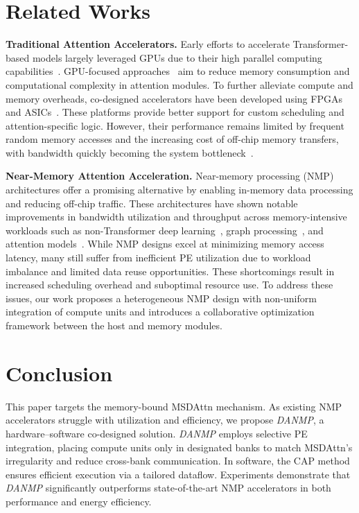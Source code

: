 \documentclass[sigconf]{acmart}
\begin{document}
\section{Related Works}
{\bf Traditional Attention Accelerators.} Early efforts to accelerate Transformer-based models largely leveraged GPUs due to their high parallel computing capabilities~\cite{Vaswani17, bert18, longformer20, Flashatten2022, zhu2021deformable, Li_2022_CVPR, zhang2023dino, Aken19, RoBERTa2019, Arnab_2021_ICCV}. GPU-focused approaches~\cite{longformer20, Flashatten2022, Zaheer20, Performer2020, Linformer2020, wu2020visual, Zaheer20} aim to reduce memory consumption and computational complexity in attention modules. To further alleviate compute and memory overheads, co-designed accelerators have been developed using FPGAs~\cite{Zhang21, bai2024dac, Li20, Ye2023} and ASICs~\cite{Ham20, Lu21, Qu22, xu2024defa, Qin2023, You2023}. These platforms provide better support for custom scheduling and attention-specific logic. However, their performance remains limited by frequent random memory accesses and the increasing cost of off-chip memory transfers, with bandwidth quickly becoming the system bottleneck~\cite{Xie2021, pim-mmu2024}.

{\bf Near-Memory Attention Acceleration.} Near-memory processing (NMP) architectures offer a promising alternative by enabling in-memory data processing and reducing off-chip traffic. These architectures have shown notable improvements in bandwidth utilization and throughput across memory-intensive workloads such as non-Transformer deep learning~\cite{Gao2017, ReGNN2022, Xu2024, Kal2021, Park2021, Liu2023, Angizi2018}, graph processing~\cite{Talati2022, Dai2022, Zhang2018}, and attention models~\cite{li2022cpsaa, Zhou2022, Ding2023, asadi2024, sadimm2025, Yang20, Kang21, Laguna2021, Zhou2021, sprint2022, Li2023, Sridharan2023, Zheng2023}. While NMP designs excel at minimizing memory access latency, many still suffer from inefficient PE utilization due to workload imbalance and limited data reuse opportunities. These shortcomings result in increased scheduling overhead and suboptimal resource use. To address these issues, our work proposes a heterogeneous NMP design with non-uniform integration of compute units and introduces a collaborative optimization framework between the host and memory modules.


\section{Conclusion}
This paper targets the memory-bound MSDAttn mechanism. As existing NMP accelerators struggle with utilization and efficiency, we propose \textit{DANMP}, a hardware–software co-designed solution. \textit{DANMP} employs selective PE integration, placing compute units only in designated banks to match MSDAttn’s irregularity and reduce cross-bank communication. In software, the CAP method ensures efficient execution via a tailored dataflow. Experiments demonstrate that \textit{DANMP} significantly outperforms state-of-the-art NMP accelerators in both performance and energy efficiency.



\end{document}
